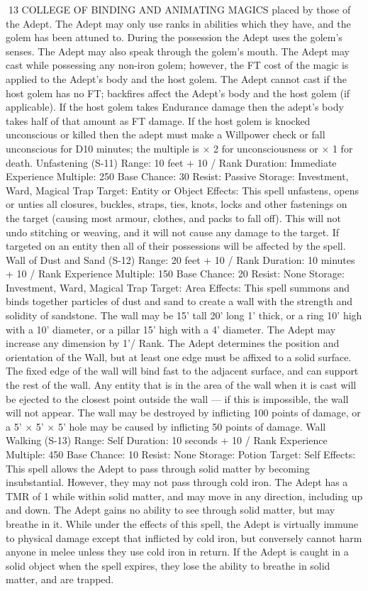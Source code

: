 \documentclass[a4paper]{article}
\begin{document}
\begin{multicols}{3}
13 COLLEGE OF BINDING AND ANIMATING MAGICS
placed by those of the Adept. The Adept may only
use ranks in abilities which they have, and the
golem has been attuned to.
During the possession the Adept uses the golem’s
senses. The Adept may also speak through the
golem’s mouth.
The Adept may cast while possessing any non-iron
golem; however, the FT cost of the magic is applied to the Adept’s body and the host golem. The
Adept cannot cast if the host golem has no FT;
backfires affect the Adept’s body and the host
golem (if applicable).
If the host golem takes Endurance damage then the
adept’s body takes half of that amount as FT damage. If the host golem is knocked unconscious or
killed then the adept must make a Willpower check
or fall unconscious for D10 minutes; the multiple is
× 2 for unconsciousness or × 1 for death.
Unfastening (S-11)
Range: 10 feet + 10 / Rank
Duration: Immediate
Experience Multiple: 250
Base Chance: 30%
Resist: Passive
Storage: Investment, Ward, Magical Trap
Target: Entity or Object
Effects: This spell unfastens, opens or unties all
closures, buckles, straps, ties, knots, locks and
other fastenings on the target (causing most armour, clothes, and packs to fall off). This will not
undo stitching or weaving, and it will not cause any
damage to the target. If targeted on an entity then
all of their possessions will be affected by the spell.
Wall of Dust and Sand (S-12)
Range: 20 feet + 10 / Rank
Duration: 10 minutes + 10 / Rank
Experience Multiple: 150
Base Chance: 20%
Resist: None
Storage: Investment, Ward, Magical Trap
Target: Area
Effects: This spell summons and binds together
particles of dust and sand to create a wall with the
strength and solidity of sandstone. The wall may be
15’ tall 20’ long 1’ thick, or a ring 10’ high with a
10’ diameter, or a pillar 15’ high with a 4’ diameter. The Adept may increase any dimension by 1’/
Rank. The Adept determines the position and orientation of the Wall, but at least one edge must be
affixed to a solid surface. The fixed edge of the
wall will bind fast to the adjacent surface, and can
support the rest of the wall. Any entity that is in the
area of the wall when it is cast will be ejected to
the closest point outside the wall — if this is impossible, the wall will not appear. The wall may be
destroyed by inflicting 100 points of damage, or a
5’ × 5’ × 5’ hole may be caused by inflicting 50
points of damage.
Wall Walking (S-13)
Range: Self
Duration: 10 seconds + 10 / Rank
Experience Multiple: 450
Base Chance: 10%
Resist: None
Storage: Potion
Target: Self
Effects: This spell allows the Adept to pass through
solid matter by becoming insubstantial. However,
they may not pass through cold iron. The Adept
has a TMR of 1 while within solid matter, and may
move in any direction, including up and down. The
Adept gains no ability to see through solid matter,
but may breathe in it. While under the effects of
this spell, the Adept is virtually immune to physical damage except that inflicted by cold iron, but
conversely cannot harm anyone in melee unless
they use cold iron in return. If the Adept is caught
in a solid object when the spell expires, they lose
the ability to breathe in solid matter, and are
trapped.


\end{multicols}
\end{document}
